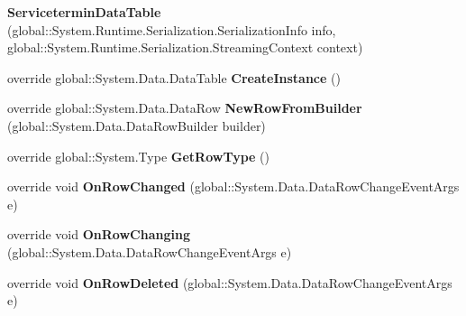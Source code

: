 \begin{DoxyCompactItemize}
\item 
{\bfseries Servicetermin\+Data\+Table} (global\+::\+System.\+Runtime.\+Serialization.\+Serialization\+Info info, global\+::\+System.\+Runtime.\+Serialization.\+Streaming\+Context context)\hypertarget{class_products_1_1_data_1_1ds_sage_1_1_servicetermin_data_table_a6418f8bc5b77f110958286b1cad90fa0}{}\label{class_products_1_1_data_1_1ds_sage_1_1_servicetermin_data_table_a6418f8bc5b77f110958286b1cad90fa0}

\item 
override global\+::\+System.\+Data.\+Data\+Table {\bfseries Create\+Instance} ()\hypertarget{class_products_1_1_data_1_1ds_sage_1_1_servicetermin_data_table_a3536c64698569e4a430c9a6075c5b107}{}\label{class_products_1_1_data_1_1ds_sage_1_1_servicetermin_data_table_a3536c64698569e4a430c9a6075c5b107}

\item 
override global\+::\+System.\+Data.\+Data\+Row {\bfseries New\+Row\+From\+Builder} (global\+::\+System.\+Data.\+Data\+Row\+Builder builder)\hypertarget{class_products_1_1_data_1_1ds_sage_1_1_servicetermin_data_table_a24c779ec3fafed49809959b87b7f5c41}{}\label{class_products_1_1_data_1_1ds_sage_1_1_servicetermin_data_table_a24c779ec3fafed49809959b87b7f5c41}

\item 
override global\+::\+System.\+Type {\bfseries Get\+Row\+Type} ()\hypertarget{class_products_1_1_data_1_1ds_sage_1_1_servicetermin_data_table_a70b1f53c8d11d6e45660079e936f30d0}{}\label{class_products_1_1_data_1_1ds_sage_1_1_servicetermin_data_table_a70b1f53c8d11d6e45660079e936f30d0}

\item 
override void {\bfseries On\+Row\+Changed} (global\+::\+System.\+Data.\+Data\+Row\+Change\+Event\+Args e)\hypertarget{class_products_1_1_data_1_1ds_sage_1_1_servicetermin_data_table_a2d5e20aee8c9871f38dfd2b799aab0ec}{}\label{class_products_1_1_data_1_1ds_sage_1_1_servicetermin_data_table_a2d5e20aee8c9871f38dfd2b799aab0ec}

\item 
override void {\bfseries On\+Row\+Changing} (global\+::\+System.\+Data.\+Data\+Row\+Change\+Event\+Args e)\hypertarget{class_products_1_1_data_1_1ds_sage_1_1_servicetermin_data_table_a6caf8a4872e6405027b0a9d070e4d6e8}{}\label{class_products_1_1_data_1_1ds_sage_1_1_servicetermin_data_table_a6caf8a4872e6405027b0a9d070e4d6e8}

\item 
override void {\bfseries On\+Row\+Deleted} (global\+::\+System.\+Data.\+Data\+Row\+Change\+Event\+Args e)\hypertarget{class_products_1_1_data_1_1ds_sage_1_1_servicetermin_data_table_a7a5bde85c11978cade2e15c1a3c67af4}{}\label{class_products_1_1_data_1_1ds_sage_1_1_servicetermin_data_table_a7a5bde85c11978cade2e15c1a3c67af4}


\end{DoxyCompactItemize}
